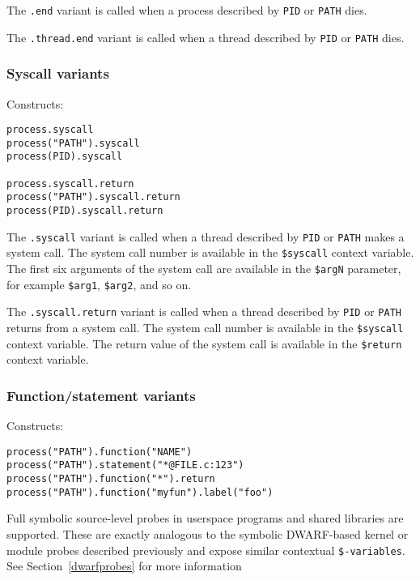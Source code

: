 \documentclass[twoside,english]{article}
\newenvironment{vindent}
{\begin{list}{}{\setlength{\listparindent}{6pt}}
\item[]}
{\end{list}}
\begin{document}
The \texttt{.end} variant is called when a process described by
\texttt{PID} or \texttt{PATH} dies.

The \texttt{.thread.end} variant is called when a thread described by
\texttt{PID} or \texttt{PATH} dies.

\subsubsection{Syscall variants}
\label{sec:syscallvariants}
Constructs:
\begin{vindent}
\begin{verbatim}
process.syscall
process("PATH").syscall
process(PID).syscall

process.syscall.return
process("PATH").syscall.return
process(PID).syscall.return
\end{verbatim}
\end{vindent}

The \texttt{.syscall} variant is called when a thread described by
\texttt{PID} or \texttt{PATH} makes a system call.  The system call
number is available in the \texttt{\$syscall} context variable.  The
first six arguments of the system call are available in the
\texttt{\$argN} parameter, for example \texttt{\$arg1},
\texttt{\$arg2}, and so on.

The \texttt{.syscall.return} variant is called when a thread described
by \texttt{PID} or \texttt{PATH} returns from a system call.  The
system call number is available in the \texttt{\$syscall} context
variable.  The return value of the system call is available in the
\texttt{\$return} context variable.


\subsubsection{Function/statement variants}
\label{sec:function-statement}
Constructs:
\begin{vindent}
\begin{verbatim}
process("PATH").function("NAME")
process("PATH").statement("*@FILE.c:123")
process("PATH").function("*").return
process("PATH").function("myfun").label("foo")
\end{verbatim}
\end{vindent}

Full symbolic source-level probes in userspace programs and shared
libraries are supported.  These are exactly analogous to the symbolic
DWARF-based kernel or module probes described previously and expose
similar contextual \texttt{\$-variables}. See
Section~\ref{dwarfprobes} for more information
\end{document}
